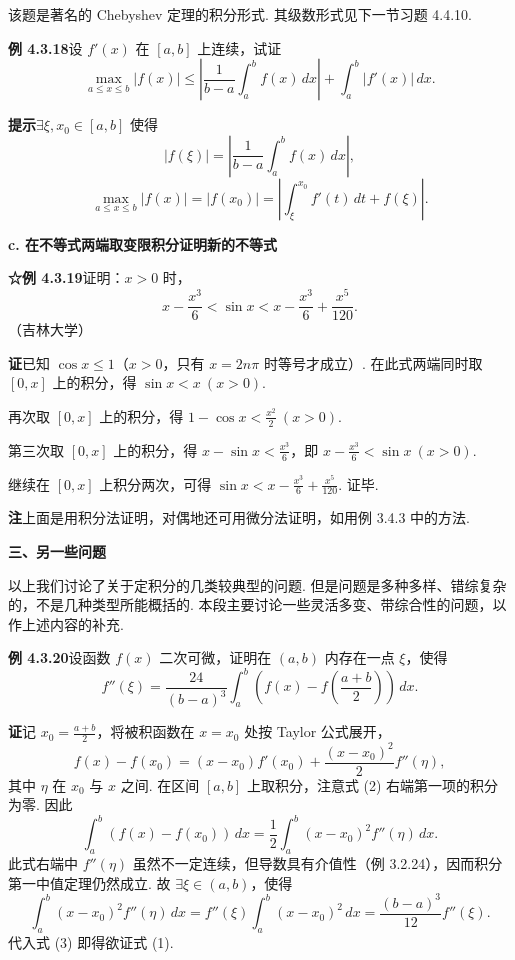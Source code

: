 \documentclass[UTF8,12pt,a4paper,fontset=fandol]{ctexart}
\begin{document}
该题是著名的 Chebyshev 定理的积分形式. 其级数形式见下一节习题 4.4.10.

\noindent\textbf{例 4.3.18}\quad 设 $f'(x)$ 在 $[a,b]$ 上连续，试证
\[
\max_{a\le x\le b}|f(x)|
\le\left|\frac1{b-a}\int_a^b f(x)\,dx\right|
+\int_a^b|f'(x)|\,dx.
\]

\noindent\textbf{提示}\quad $\exists\xi,x_0\in[a,b]$ 使得
\[
|f(\xi)|=\left|\frac1{b-a}\int_a^b f(x)\,dx\right|,
\]
\[
\max_{a\le x\le b}|f(x)|
=|f(x_0)|
=\left|\int_\xi^{x_0} f'(t)\,dt+f(\xi)\right|.
\]

\noindent\textbf{c. 在不等式两端取变限积分证明新的不等式}

\noindent\textbf{☆例 4.3.19}\quad 证明：$x>0$ 时，
\[
x-\frac{x^3}{6}<\sin x<x-\frac{x^3}{6}+\frac{x^5}{120}.
\]
（吉林大学）

\noindent\textbf{证}\quad 已知 $\cos x\le1$（$x>0$，只有 $x=2n\pi$ 时等号才成立）. 在此式两端同时取 $[0,x]$ 上的积分，得 $\sin x<x\ (x>0)$.

再次取 $[0,x]$ 上的积分，得 $1-\cos x<\frac{x^2}{2}\ (x>0)$.

第三次取 $[0,x]$ 上的积分，得 $x-\sin x<\frac{x^3}{6}$，即 $x-\frac{x^3}{6}<\sin x\ (x>0)$.

继续在 $[0,x]$ 上积分两次，可得 $\sin x<x-\frac{x^3}{6}+\frac{x^5}{120}$. 证毕.

\noindent\textbf{注}\quad 上面是用积分法证明，对偶地还可用微分法证明，如用例 3.4.3 中的方法.

\noindent\textbf{三、另一些问题}

以上我们讨论了关于定积分的几类较典型的问题. 但是问题是多种多样、错综复杂的，不是几种类型所能概括的. 本段主要讨论一些灵活多变、带综合性的问题，以作上述内容的补充.

\noindent\textbf{例 4.3.20}\quad 设函数 $f(x)$ 二次可微，证明在 $(a,b)$ 内存在一点 $\xi$，使得
\[
f''(\xi)=\frac{24}{(b-a)^3}\int_a^b\left(f(x)-f\left(\frac{a+b}{2}\right)\right)\,dx.
\tag{1}
\]

\noindent\textbf{证}\quad 记 $x_0=\frac{a+b}{2}$，将被积函数在 $x=x_0$ 处按 Taylor 公式展开，
\[
f(x)-f(x_0)=(x-x_0)f'(x_0)+\frac{(x-x_0)^2}{2}f''(\eta),
\tag{2}
\]
其中 $\eta$ 在 $x_0$ 与 $x$ 之间. 在区间 $[a,b]$ 上取积分，注意式 (2) 右端第一项的积分为零. 因此
\[
\int_a^b(f(x)-f(x_0))\,dx
=\frac12\int_a^b(x-x_0)^2f''(\eta)\,dx.
\tag{3}
\]
此式右端中 $f''(\eta)$ 虽然不一定连续，但导数具有介值性（例 3.2.24），因而积分第一中值定理仍然成立. 故 $\exists\xi\in(a,b)$，使得
\[
\int_a^b(x-x_0)^2f''(\eta)\,dx
=f''(\xi)\int_a^b(x-x_0)^2\,dx
=\frac{(b-a)^3}{12}f''(\xi).
\]
代入式 (3) 即得欲证式 (1).
\end{document}
